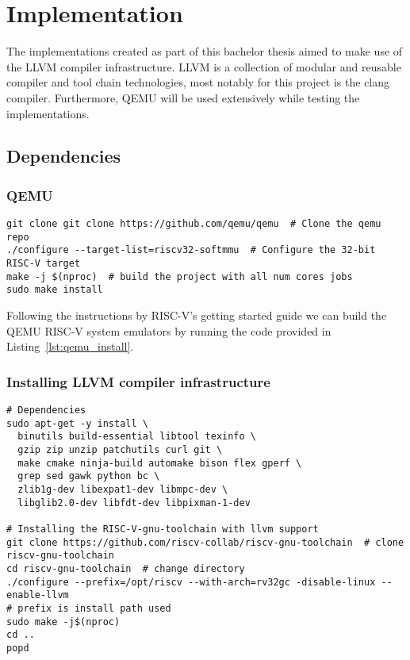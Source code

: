 \section{Implementation}
The implementations created as part of this bachelor thesis aimed to make use of
the LLVM compiler infrastructure. LLVM is a collection of modular and reusable
compiler and tool chain technologies, most notably for this project is the clang
compiler. Furthermore, QEMU will be used extensively while testing the
implementations.

\subsection{Dependencies}
\subsubsection*{QEMU}
\begin{lstlisting}[caption=Installing QEMU, float=*, label=lst:qemu_install]
git clone git clone https://github.com/qemu/qemu  # Clone the qemu repo
./configure --target-list=riscv32-softmmu  # Configure the 32-bit RISC-V target
make -j $(nproc)  # build the project with all num cores jobs
sudo make install
\end{lstlisting}
Following the instructions by RISC-V's getting started guide
we can build the QEMU RISC-V system emulators by running the code
provided in Listing~\ref{lst:qemu_install}\cite{RISC-V_GS}.
\subsubsection{Installing LLVM compiler infrastructure}
\begin{lstlisting}[caption=Installing LLVM compiler infastructure with RISC-V
32-bit as native target., float=*, label=lst:llvm_install]
# Dependencies
sudo apt-get -y install \
  binutils build-essential libtool texinfo \
  gzip zip unzip patchutils curl git \
  make cmake ninja-build automake bison flex gperf \
  grep sed gawk python bc \
  zlib1g-dev libexpat1-dev libmpc-dev \
  libglib2.0-dev libfdt-dev libpixman-1-dev

# Installing the RISC-V-gnu-toolchain with llvm support
git clone https://github.com/riscv-collab/riscv-gnu-toolchain  # clone
riscv-gnu-toolchain
cd riscv-gnu-toolchain  # change directory
./configure --prefix=/opt/riscv --with-arch=rv32gc -disable-linux --enable-llvm
# prefix is install path used
sudo make -j$(nproc)
cd ..
popd
\end{lstlisting}

